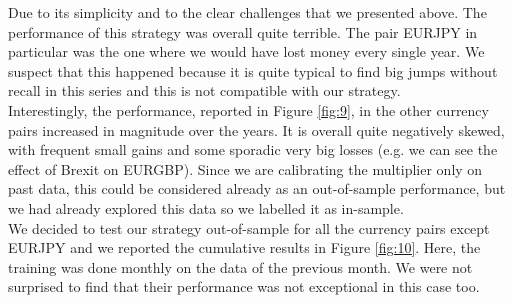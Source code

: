 \documentclass[a4paper]{article}
\begin{document}
Due to its simplicity and to the clear challenges that we presented above. The performance of this strategy was overall quite terrible. The pair EURJPY in particular was the one where we would have lost money every single year. We suspect that this happened because it is quite typical to find big jumps without recall in this series and this is not compatible with our strategy.\\
Interestingly, the performance, reported in Figure \ref{fig:9}, in the other currency pairs increased in magnitude over the years. It is overall quite negatively skewed, with frequent small gains and some sporadic very big losses (e.g. we can see the effect of Brexit on EURGBP). Since we are calibrating the multiplier only on past data, this could be considered already as an out-of-sample performance, but we had already explored this data so we labelled it as in-sample.\\
We decided to test our strategy out-of-sample for all the currency pairs except EURJPY and we reported the cumulative results in Figure \ref{fig:10}. Here, the training was done monthly on the data of the previous month. We were not surprised to find that their performance was not exceptional in this case too.
\end{document}
